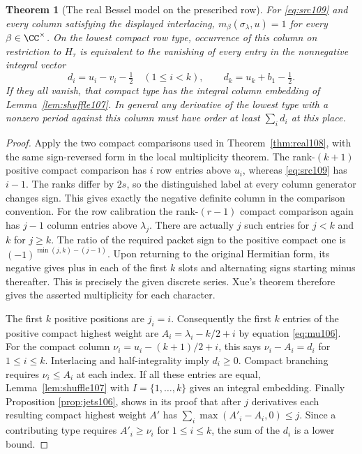 \documentclass[a4paper,11pt]{article}
\newtheorem{theorem}[proposition]{Theorem}
\theoremstyle{definition}
\theoremstyle{remark}
\numberwithin{equation}{section}
\begin{document}
\begin{theorem}[The real Bessel model on the prescribed row]\label{thm:src109}
For \eqref{eq:src109} and every column satisfying the displayed
interlacing, \(m_\beta(\sigma_\lambda,u)=1\) for every
\(\beta\in\CC^\times\). On the lowest compact row type, occurrence
of this column on restriction to \(H_\tau\) is equivalent to
the vanishing of every entry in the nonnegative integral vector
\[
 d_i=u_i-v_i-\tfrac12\quad(1\le i<k),\qquad
 d_k=u_k+b_1-\tfrac12 .
\]
If they all vanish, that compact type has the integral column
embedding of Lemma~\ref{lem:shuffle107}. In general any derivative
of the lowest type with a nonzero period against this column must
have order at least \(\sum_i d_i\) at this place.
\end{theorem}
\begin{proof}
Apply the two compact comparisons used in Theorem~\ref{thm:real108},
with the same sign-reversed form in the local multiplicity theorem.
The rank-\((k+1)\) positive compact comparison has \(i\) row
entries above \(u_i\), whereas \eqref{eq:src109} has \(i-1\).
The ranks differ by \(2s\), so the distinguished label at every
column generator changes sign. This gives exactly the negative
definite column in the comparison convention. For the row
calibration the rank-\((r-1)\) compact comparison again has
\(j-1\) column entries above \(\lambda_j\). There are actually
\(j\) such entries for \(j<k\) and \(k\) for \(j\ge k\).
The ratio of the required packet sign to the positive compact
one is \((-1)^{\min(j,k)-(j-1)}\). Upon returning to the
original Hermitian form, its negative gives plus in each of the
first \(k\) slots and alternating signs starting minus thereafter.
This is precisely the given discrete series. Xue's theorem
therefore gives the asserted multiplicity for each character.

The first \(k\) positive positions are \(j_i=i\). Consequently
the first \(k\) entries of the positive compact highest weight
are \(A_i=\lambda_i-k/2+i\) by
equation \ref{eq:mu106}.
For the compact column \(\nu_i=u_i-(k+1)/2+i\), this says
\(\nu_i-A_i=d_i\) for \(1\le i\le k\). Interlacing and
half-integrality imply \(d_i\ge0\). Compact branching requires
\(\nu_i\le A_i\) at each index. If all these entries are equal,
Lemma~\ref{lem:shuffle107} with \(I=\{1,\ldots,k\}\) gives
an integral embedding. Finally Proposition \ref{prop:jets106},
shows in its proof that after \(j\) derivatives each resulting
compact highest weight \(A'\) has
\(\sum_i\max(A'_i-A_i,0)\le j\). Since a contributing type
requires \(A'_i\ge\nu_i\) for \(1\le i\le k\), the sum of the
\(d_i\) is a lower bound.
\end{proof}
\end{document}

